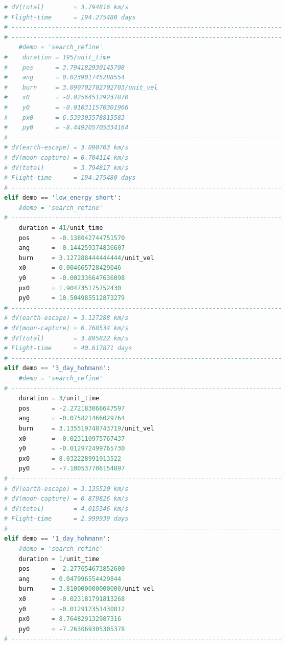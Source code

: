 \begin{adjustwidth*}{0cm}{-0.4cm}
\begin{lstlisting}[language=Python]
# dV(total)        = 3.794816 km/s
# Flight-time      = 194.275480 days
# --------------------------------------------------------------------------
# --------------------------------------------------------------------------
    #demo = 'search_refine'
#    duration = 195/unit_time
#    pos      = 3.794182930145708
#    ang      = 0.023901745288554
#    burn     = 3.090702702702703/unit_vel
#    x0       = -0.025645129237870
#    y0       = -0.010311570301966
#    px0      = 6.539303578815583
#    py0      = -8.449205705334164
# --------------------------------------------------------------------------
# dV(earth-escape) = 3.090703 km/s
# dV(moon-capture) = 0.704114 km/s
# dV(total)        = 3.794817 km/s
# Flight-time      = 194.275480 days
# --------------------------------------------------------------------------
elif demo == 'low_energy_short':
    #demo = 'search_refine'
# --------------------------------------------------------------------------
    duration = 41/unit_time
    pos      = -0.138042744751570
    ang      = -0.144259374836607
    burn     = 3.127288444444444/unit_vel
    x0       = 0.004665728429046
    y0       = -0.002336647636098
    px0      = 1.904735175752430
    py0      = 10.504985512873279
# --------------------------------------------------------------------------
# dV(earth-escape) = 3.127288 km/s
# dV(moon-capture) = 0.768534 km/s
# dV(total)        = 3.895822 km/s
# Flight-time      = 40.617871 days
# --------------------------------------------------------------------------
elif demo == '3_day_hohmann':
    #demo = 'search_refine'
# --------------------------------------------------------------------------
    duration = 3/unit_time
    pos      = -2.272183066647597
    ang      = -0.075821466029764
    burn     = 3.135519748743719/unit_vel
    x0       = -0.023110975767437
    y0       = -0.012972499765730
    px0      = 8.032228991913522
    py0      = -7.100537706154897
# --------------------------------------------------------------------------
# dV(earth-escape) = 3.135520 km/s
# dV(moon-capture) = 0.879826 km/s
# dV(total)        = 4.015346 km/s
# Flight-time      = 2.999939 days
# --------------------------------------------------------------------------
elif demo == '1_day_hohmann':
    #demo = 'search_refine'
    duration = 1/unit_time
    pos      = -2.277654673852600
    ang      = 0.047996554429844
    burn     = 3.810000000000000/unit_vel
    x0       = -0.023181791813268
    y0       = -0.012912351430812
    px0      = 8.764829132987316
    py0      = -7.263069305305378
# --------------------------------------------------------------------------

\end{lstlisting}
\end{adjustwidth*}
